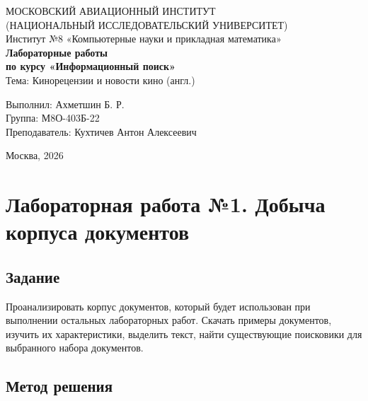 \documentclass[a4paper,12pt]{article}
\begin{document}
\begin{titlepage}
    \centering
    {\fontsize{14pt}{16pt}\selectfont МОСКОВСКИЙ АВИАЦИОННЫЙ ИНСТИТУТ\\(НАЦИОНАЛЬНЫЙ ИССЛЕДОВАТЕЛЬСКИЙ УНИВЕРСИТЕТ)}\\[0.5cm]
    {\fontsize{12pt}{14pt}\selectfont Институт №8 «Компьютерные науки и прикладная математика»}\\[4cm]
    
    {\fontsize{16pt}{18pt}\selectfont \textbf{Лабораторные работы}}\\
    {\fontsize{14pt}{16pt}\selectfont \textbf{по курсу «Информационный поиск»}}\\[0.3cm]
    {\fontsize{12pt}{14pt}\selectfont Тема: Кинорецензии и новости кино (англ.)}\\[4cm]
    
    \vfill
    \begin{flushright}
        \begin{minipage}{0.51\textwidth}
            Выполнил: Ахметшин Б. Р. \\
            Группа: М8О-403Б-22\\
            Преподаватель: Кухтичев Антон Алексеевич
        \end{minipage}
    \end{flushright}
    
    \vfill
    {\large Москва, 2026}
\end{titlepage}

\tableofcontents
\newpage

\section{Лабораторная работа №1. Добыча корпуса документов}

\subsection{Задание}

Проанализировать корпус документов, который будет использован при выполнении остальных лабораторных работ. Скачать примеры документов, изучить их характеристики, выделить текст, найти существующие поисковики для выбранного набора документов.

\subsection{Метод решения}
\end{document}
